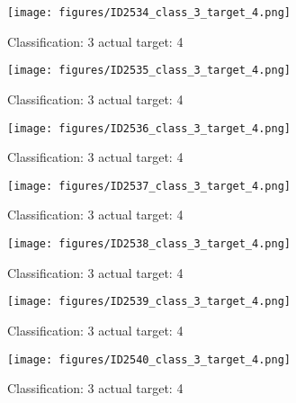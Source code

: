 \begin{figure}[h!]
\begin{center}
\texttt{[image: figures/ID2534\_class\_3\_target\_4.png]}
\end{center}
\caption{ Classification: 3 actual target: 4}
\label{fig:ID2534_class_3_target_4}
\end{figure}
\begin{figure}[h!]
\begin{center}
\texttt{[image: figures/ID2535\_class\_3\_target\_4.png]}
\end{center}
\caption{ Classification: 3 actual target: 4}
\label{fig:ID2535_class_3_target_4}
\end{figure}
\begin{figure}[h!]
\begin{center}
\texttt{[image: figures/ID2536\_class\_3\_target\_4.png]}
\end{center}
\caption{ Classification: 3 actual target: 4}
\label{fig:ID2536_class_3_target_4}
\end{figure}
\begin{figure}[h!]
\begin{center}
\texttt{[image: figures/ID2537\_class\_3\_target\_4.png]}
\end{center}
\caption{ Classification: 3 actual target: 4}
\label{fig:ID2537_class_3_target_4}
\end{figure}
\begin{figure}[h!]
\begin{center}
\texttt{[image: figures/ID2538\_class\_3\_target\_4.png]}
\end{center}
\caption{ Classification: 3 actual target: 4}
\label{fig:ID2538_class_3_target_4}
\end{figure}
\begin{figure}[h!]
\begin{center}
\texttt{[image: figures/ID2539\_class\_3\_target\_4.png]}
\end{center}
\caption{ Classification: 3 actual target: 4}
\label{fig:ID2539_class_3_target_4}
\end{figure}
\begin{figure}[h!]
\begin{center}
\texttt{[image: figures/ID2540\_class\_3\_target\_4.png]}
\end{center}
\caption{ Classification: 3 actual target: 4}
\label{fig:ID2540_class_3_target_4}
\end{figure}
